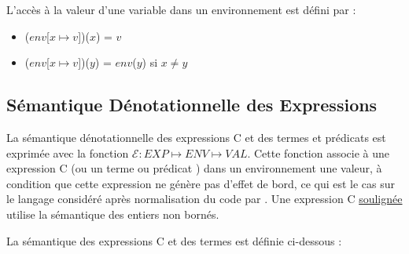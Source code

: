 L'accès à la valeur d'une variable dans un environnement est défini par :
\begin{itemize}
\item ($env$[$x \mapsto v$])($x$) = $v$
\item ($env$[$x \mapsto v$])($y$) = $env$($y$) si $x \neq y$
\end{itemize}


\subsection{Sémantique Dénotationnelle des Expressions}

La sémantique dénotationnelle des expressions C et des termes et prédicats
\eacsl est exprimée avec la fonction
$\mathcal{E} : EXP \mapsto ENV \mapsto VAL$.
Cette fonction associe à une expression C (ou un terme ou prédicat \eacsl) dans
un environnement une valeur, à condition que cette expression ne génère pas
d'effet de bord, ce qui est le cas sur le langage considéré après normalisation
du code par \framac.
Une expression C \underline{soulignée} utilise la sémantique des entiers non
bornés.

La sémantique des expressions C et des termes \eacsl est définie ci-dessous :

